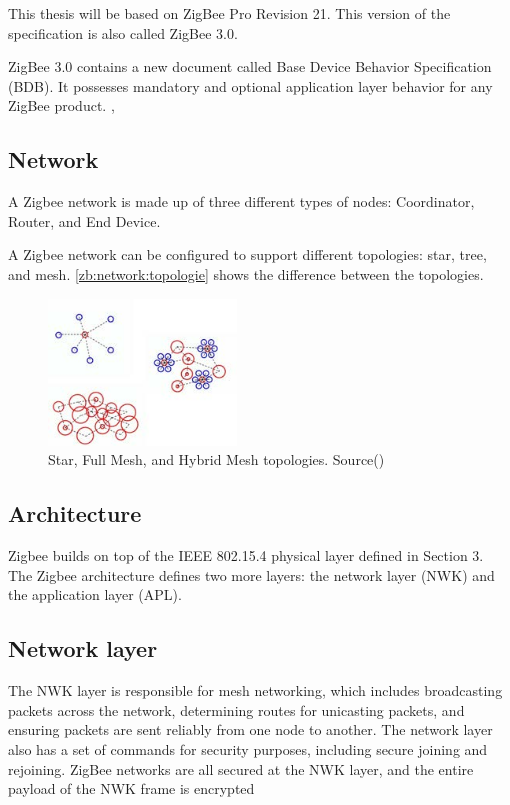 This thesis will be based on ZigBee Pro Revision 21. This version of the specification is also called ZigBee 3.0.

ZigBee 3.0 contains a new document called Base Device Behavior Specification (BDB).
It possesses mandatory and optional application layer behavior for any ZigBee product. \cite{ti:new:19}, \cite{10.1145/3098243.3098254}

\subsection{Network}
\label{zb:net:intro}

A Zigbee network is made up of three different types of nodes: Coordinator, Router, and End Device. \cite{Whitehurst:14}

A Zigbee network can be configured to support different topologies: star, tree, and mesh. \autoref{zb:network:topologie} shows the difference between the topologies.

\begin{figure}[!ht]
    \centering
    \includegraphics[width=50mm, keepaspectratio]{figures/zigbee-topology-ug103-02-fundamentals-zigbee.jpg}
    \caption{Star, Full Mesh, and Hybrid Mesh topologies. Source(\cite{zigbee:silabs:ug103:2})}
    \label{zb:network:topologie}
\end{figure}

\subsection{Architecture}

Zigbee builds on top of the IEEE 802.15.4 physical layer defined in Section 3. The Zigbee architecture defines two more layers: the network layer (NWK) and the application layer (APL).

\subsection{Network layer}

The NWK layer is responsible for mesh networking, which includes broadcasting packets across the network, determining routes for unicasting packets, and ensuring packets are sent reliably from one node to another. The network layer also has a set of commands for security purposes, including secure joining and rejoining. ZigBee networks are all secured at the NWK layer, and the entire payload of the NWK frame is encrypted

